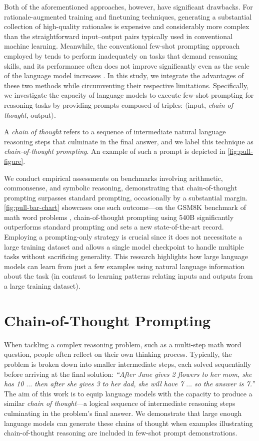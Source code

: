 Both of the aforementioned approaches, however, have significant drawbacks. For rationale-augmented training and finetuning techniques, generating a substantial collection of high-quality rationales is expensive and considerably more complex than the straightforward input--output pairs typically used in conventional machine learning. Meanwhile, the conventional few-shot prompting approach employed by \citet{brown2020language} tends to perform inadequately on tasks that demand reasoning skills, and its performance often does not improve significantly even as the scale of the language model increases \citep{rae2021scaling}. In this study, we integrate the advantages of these two methods while circumventing their respective limitations. Specifically, we investigate the capacity of language models to execute few-shot prompting for reasoning tasks by providing prompts composed of triples: $\langle$input, \emph{chain of thought}, output$\rangle$.

A \emph{chain of thought} refers to a sequence of intermediate natural language reasoning steps that culminate in the final answer, and we label this technique as \textit{chain-of-thought prompting}. An example of such a prompt is depicted in \cref{fig:pull-figure}.

We conduct empirical assessments on benchmarks involving arithmetic, commonsense, and symbolic reasoning, demonstrating that chain-of-thought prompting surpasses standard prompting, occasionally by a substantial margin. \cref{fig:pull-bar-chart} showcases one such outcome—on the GSM8K benchmark of math word problems \citep{cobbe2021training}, chain-of-thought prompting using \palm{} 540B significantly outperforms standard prompting and sets a new state-of-the-art record. Employing a prompting-only strategy is crucial since it does not necessitate a large training dataset and allows a single model checkpoint to handle multiple tasks without sacrificing generality. This research highlights how large language models can learn from just a few examples using natural language information about the task (in contrast to learning patterns relating inputs and outputs from a large training dataset).

\section{Chain-of-Thought Prompting} When tackling a complex reasoning problem, such as a multi-step math word question, people often reflect on their own thinking process. Typically, the problem is broken down into smaller intermediate steps, each solved sequentially before arriving at the final solution: \textit{``After Jane gives 2 flowers to her mom, she has 10 $\ldots$ then after she gives 3 to her dad, she will have 7 $\ldots$ so the answer is 7.''} The aim of this work is to equip language models with the capacity to produce a similar \textit{chain of thought}—a logical sequence of intermediate reasoning steps culminating in the problem's final answer. We demonstrate that large enough language models can generate these chains of thought when examples illustrating chain-of-thought reasoning are included in few-shot prompt demonstrations.

